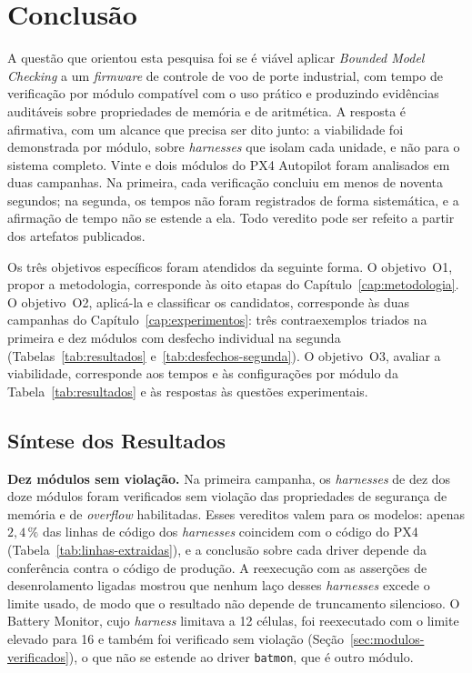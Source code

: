 \chapter{Conclusão}
\label{cap:conclusao}

A questão que orientou esta pesquisa foi se é viável aplicar \textit{Bounded
Model Checking} a um \textit{firmware} de controle de voo de porte industrial,
com tempo de verificação por módulo compatível com o uso prático e produzindo
evidências auditáveis sobre propriedades de memória e de aritmética. A resposta
é afirmativa, com um alcance que precisa ser dito junto: a viabilidade foi
demonstrada por módulo, sobre \textit{harnesses} que isolam cada unidade, e não
para o sistema completo. Vinte e dois módulos do PX4 Autopilot foram
analisados em duas campanhas. Na primeira, cada verificação concluiu em menos
de noventa segundos; na segunda, os tempos não foram registrados de forma
sistemática, e a afirmação de tempo não se estende a ela. Todo veredito pode ser
refeito a partir dos artefatos publicados.

Os três objetivos específicos foram atendidos da seguinte forma. O objetivo~O1,
propor a metodologia, corresponde às oito etapas do
Capítulo~\ref{cap:metodologia}. O objetivo~O2, aplicá-la e classificar os
candidatos, corresponde às duas campanhas do Capítulo~\ref{cap:experimentos}:
três contraexemplos triados na primeira e dez módulos com desfecho individual
na segunda (Tabelas~\ref{tab:resultados} e~\ref{tab:desfechos-segunda}). O
objetivo~O3, avaliar a viabilidade, corresponde aos tempos e às configurações
por módulo da Tabela~\ref{tab:resultados} e às respostas às questões
experimentais.

\section{Síntese dos Resultados}
\label{sec:conclusao-sintese}

\textbf{Dez módulos sem violação.} Na primeira campanha, os
\textit{harnesses} de dez dos doze módulos foram verificados sem violação das
propriedades de segurança de memória e de \textit{overflow} habilitadas. Esses
vereditos valem para os modelos: apenas $2{,}4\,\%$ das linhas de código dos
\textit{harnesses} coincidem com o código do PX4 (Tabela~\ref{tab:linhas-extraidas}), e a
conclusão sobre cada driver depende da conferência contra o código de produção. A
reexecução com as asserções de desenrolamento ligadas mostrou que nenhum laço
desses \textit{harnesses} excede o limite usado, de modo que o resultado não
depende de truncamento silencioso. O Battery Monitor, cujo \textit{harness} limitava a 12 células, foi reexecutado com o limite elevado para 16 e também foi verificado sem violação (Seção~\ref{sec:modulos-verificados}), o que não se estende ao driver \texttt{batmon}, que é outro módulo.


